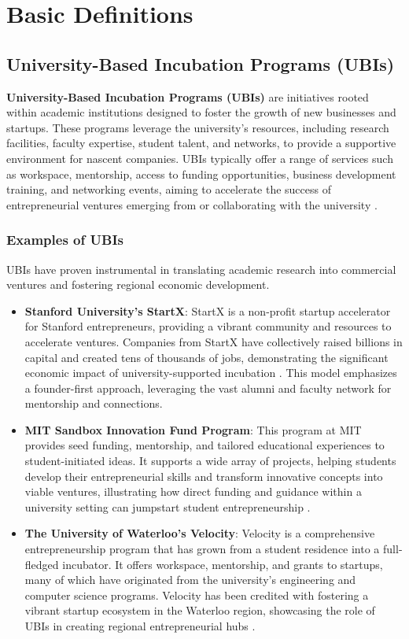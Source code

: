 \documentclass[../Main.tex]{subfiles}
\begin{document}
\section{Basic Definitions}
\subsection{University-Based Incubation Programs (UBIs)}
\textbf{University-Based Incubation Programs (UBIs)} are initiatives rooted within academic institutions designed to foster the growth of new businesses and startups. These programs leverage the university's resources, including research facilities, faculty expertise, student talent, and networks, to provide a supportive environment for nascent companies. UBIs typically offer a range of services such as workspace, mentorship, access to funding opportunities, business development training, and networking events, aiming to accelerate the success of entrepreneurial ventures emerging from or collaborating with the university \cite{grimaldi2005university, siegel2003assessing}.

\subsubsection*{Examples of UBIs}
UBIs have proven instrumental in translating academic research into commercial ventures and fostering regional economic development.
\begin{itemize}
\item \textbf{Stanford University's StartX}: StartX is a non-profit startup accelerator for Stanford entrepreneurs, providing a vibrant community and resources to accelerate ventures. Companies from StartX have collectively raised billions in capital and created tens of thousands of jobs, demonstrating the significant economic impact of university-supported incubation \cite{StartX2024}. This model emphasizes a founder-first approach, leveraging the vast alumni and faculty network for mentorship and connections.
\item \textbf{MIT Sandbox Innovation Fund Program}: This program at MIT provides seed funding, mentorship, and tailored educational experiences to student-initiated ideas. It supports a wide array of projects, helping students develop their entrepreneurial skills and transform innovative concepts into viable ventures, illustrating how direct funding and guidance within a university setting can jumpstart student entrepreneurship \cite{MITSandbox2024}.
\item \textbf{The University of Waterloo's Velocity}: Velocity is a comprehensive entrepreneurship program that has grown from a student residence into a full-fledged incubator. It offers workspace, mentorship, and grants to startups, many of which have originated from the university's engineering and computer science programs. Velocity has been credited with fostering a vibrant startup ecosystem in the Waterloo region, showcasing the role of UBIs in creating regional entrepreneurial hubs \cite{UWaterlooVelocity2024}.
\end{itemize}
\end{document}
